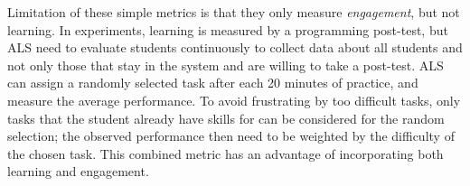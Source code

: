 Limitation of these simple metrics is that they only measure \emph{engagement},
but not learning.
In experiments, learning is measured by a programming post-test,
but ALS need to evaluate students continuously to collect data about
all students and not only those that stay in the system and are willing
to take a post-test.
ALS can assign a randomly selected task after each 20 minutes of practice,
and measure the average performance.
To avoid frustrating by too difficult tasks, only tasks that the student already have
skills for can be considered for the random selection; the observed performance
then need to be weighted by the difficulty of the chosen task.
This combined metric has an advantage of incorporating both learning and engagement.


%


